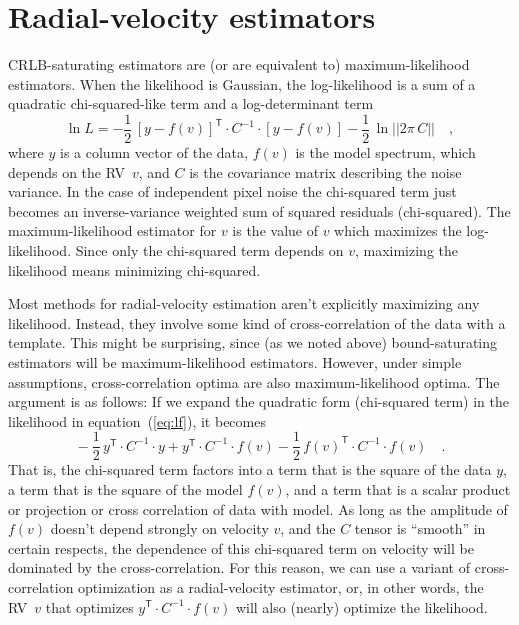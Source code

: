 \documentclass[modern]{aastex62}
\newcommand{\T}{^{\mathsf{T}}}
\newcommand{\acronym}[1]{{\small{#1}}}
\newcommand{\RV}{\acronym{RV}}
\newcommand{\CRLB}{\acronym{CRLB}}
\begin{document}
\section{Radial-velocity estimators}
\label{s:methods}

\CRLB-saturating estimators are (or are equivalent to)
maximum-likelihood estimators.
When the likelihood is Gaussian, the log-likelihood
is a sum of a quadratic chi-squared-like term and a log-determinant term
\begin{equation}
\ln L = -\frac{1}{2}\,[y - f(v)]\T\cdot C^{-1}\cdot [y - f(v)] - \frac{1}{2}\,\ln||2\pi\,C|| \quad ,
\label{eq:lf}
\end{equation}
where $y$ is a column vector of the data, $f(v)$ is the model spectrum,
which depends on the \RV\ $v$,
and $C$ is the covariance matrix describing the noise variance.
In the case of independent pixel noise the chi-squared term just becomes an
inverse-variance weighted sum of squared residuals (chi-squared).
The maximum-likelihood estimator for $v$ is the value of $v$ which maximizes
the log-likelihood.
Since only the chi-squared term depends on $v$, maximizing the likelihood
means minimizing chi-squared.

Most methods for radial-velocity estimation aren't explicitly maximizing
any likelihood.
Instead, they involve some kind of
cross-correlation of the data with a template.
This might be surprising, since (as we noted above) bound-saturating
estimators will be maximum-likelihood estimators.
However, under simple assumptions, cross-correlation optima are
also maximum-likelihood optima. The argument is as follows:
If we expand the quadratic form (chi-squared term) in the
likelihood in equation~(\ref{eq:lf}), it becomes
\begin{equation}
 {}-\frac{1}{2}\,y\T\cdot C^{-1}\cdot y
               + y\T\cdot C^{-1}\cdot f(v)
-\frac{1}{2}\,f(v)\T\cdot C^{-1}\cdot f(v) \quad.
\end{equation}
That is, the chi-squared term factors into a term that is the square
of the data $y$, a term that is the square of the model $f(v)$,
and a term that is a scalar product or projection or
cross correlation of data with model.
As long as the amplitude of $f(v)$ doesn't depend strongly on velocity $v$,
and the $C$ tensor is ``smooth'' in certain respects, the dependence of this
chi-squared term on velocity will be dominated by the
cross-correlation.
For this reason, we can use a variant of cross-correlation
optimization as a radial-velocity estimator, or, in other words, the
\RV\ $v$ that optimizes $y\T\cdot C^{-1}\cdot f(v)$ will also (nearly)
optimize the likelihood.
\end{document}
